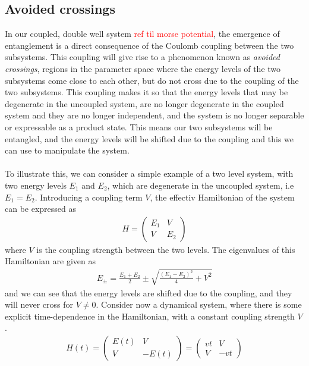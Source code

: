 \documentclass{subfiles}
\begin{document}
\subsection*{Avoided crossings}
In our coupled, double well system \textcolor{red}{ref til morse potential}, the emergence of entanglement is a direct consequence of the Coulomb coupling between the two subsystems. This coupling will give rise to a phenomenon known as \emph{avoided crossings}\cite{nazir2005anticrossings}, regions in the parameter space where the energy levels of the two subsystems come close to each other, but do not cross due to the coupling of the two subsystems. This coupling makes it so that the energy levels that may be degenerate in the uncoupled system, are no longer degenerate in the coupled system and they are no longer independent, and the system is no longer separable or expressable as a product state. This means our two subsystems will be entangled, and the energy levels will be shifted due to the coupling and this we can use to manipulate the system. \\ \\
To illustrate this, we can consider a simple example of a two level system, with two energy levels $E_1$ and $E_2$, which are degenerate in the uncoupled system, i.e $E_1 = E_2$. Introducing a coupling term $V$, the effectiv Hamiltonian of the system can be expressed as
\begin{align*}
    H = \begin{pmatrix}
        E_1 & V \\
        V & E_2
    \end{pmatrix}
\end{align*}
where $V$ is the coupling strength between the two levels. The eigenvalues of this Hamiltonian are given as
\begin{align*}
    E_\pm = \frac{E_1 + E_2}{2} \pm \sqrt{\frac{(E_1 - E_2)^2}{4} + V^2}
\end{align*}
and we can see that the energy levels are shifted due to the coupling, and they will never cross for $V\neq0$. Consider now a dynamical system, where there is some explicit time-dependence in the Hamiltonian, with a constant coupling strength $V$.
\begin{align*}
    H(t) = \begin{pmatrix}
        E(t) & V \\
        V & -E(t)
    \end{pmatrix} = \begin{pmatrix}
        vt & V \\
        V & -vt
    \end{pmatrix}
\end{align*}
\end{document}
